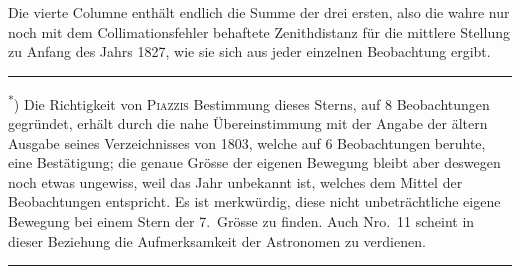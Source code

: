 Die vierte Columne enthält endlich die Summe der drei ersten, also die
wahre nur noch mit dem Collimationsfehler behaftete Zenithdistanz für die
mittlere Stellung zu Anfang des Jahrs 1827, wie sie sich aus jeder einzelnen
Beobachtung ergibt.

\medskip\noindent\rule{.24\textwidth}{.4pt}\par
{\footnotesize
\noindent\textsuperscript{*}) Die Richtigkeit von \textsc{Piazzis} Bestimmung dieses Sterns, auf 8 Beobachtungen gegründet, erhält
durch die nahe Übereinstimmung mit der Angabe der ältern Ausgabe seines Verzeichnisses von 1803,
welche auf 6 Beobachtungen beruhte, eine Bestätigung; die genaue Grösse der eigenen Bewegung bleibt
aber deswegen noch etwas ungewiss, weil das Jahr unbekannt ist, welches dem Mittel der Beobachtungen
entspricht. Es ist merkwürdig, diese nicht unbeträchtliche eigene Bewegung bei einem Stern der 7.\ Grösse
zu finden. Auch Nro.\ 11 scheint in dieser Beziehung die Aufmerksamkeit der Astronomen zu verdienen.\par}
\begin{center}\rule{.24\textwidth}{.4pt}\end{center}
